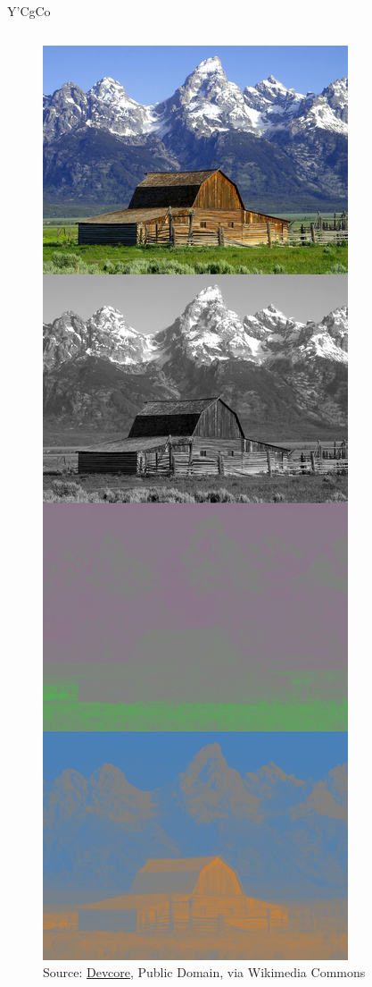 \documentclass[aspectratio=169,handout,usepdftitle=false]{fireshonks}
\begin{document}
\begin{frame}{Y'CgCo}
\begin{columns}
\begin{column}
\begin{figure}
                \includegraphics[height=10\baselineskip,keepaspectratio]{figures/Barns_grand_tetons_YCgCo_separation.jpg}
                \caption*{Source: \href{https://commons.wikimedia.org/wiki/File:Barns_grand_tetons_YCgCo_separation.jpg}{Devcore}, Public Domain, via Wikimedia Commons}
            \end{figure}
        \end{column}
    \end{columns}
\end{frame}
\end{document}
